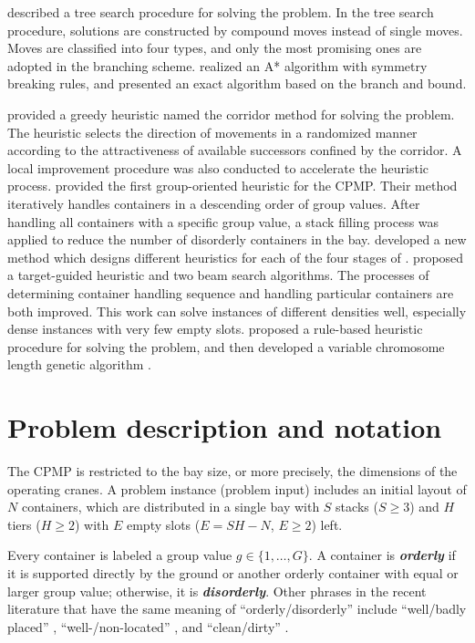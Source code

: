 \documentclass[review,3p,times,12pt,number]{elsarticle}\usepackage{amsmath}\usepackage{amssymb}
\renewcommand{\citet}[1]{\citeauthor{#1} \citep{#1}}
\renewcommand{\emph}[1]{\textbf{\textit{#1}}}
\begin{document}
\citet{bort2012} described a tree search procedure for solving the problem.
In the tree search procedure, solutions are constructed by compound moves instead of single moves. Moves are classified into four types, and only the most promising ones are adopted in the branching scheme. \citet{tierney2014} realized an A* algorithm with symmetry breaking rules, and \citet{van2014} presented an exact algorithm based on the branch and bound.


\citet{cas2009} provided a greedy heuristic named the corridor method for solving the problem. The heuristic selects the direction of movements in a randomized manner according to the attractiveness of available successors confined by the corridor.
A local improvement procedure was also conducted to accelerate the heuristic process.
\citet{exp2012} provided the first group-oriented heuristic for the CPMP\@. Their method iteratively handles containers in a descending order of group values. After handling all containers with a specific group value, a stack filling process was applied to reduce the number of disorderly containers in the bay.
\citet{jovanovic2014} developed a new method which designs different heuristics for each of the four stages of \citet{exp2012}.
\citet{wang2015} proposed a target-guided heuristic and two beam search algorithms.
The processes of determining container handling sequence and handling particular containers are both improved.
This work can solve instances of different densities well, especially dense instances with very few empty slots.
\citet{Gheith2014} proposed a rule-based heuristic procedure for solving the problem, and then developed a variable chromosome length genetic algorithm \citep{Gheith2015}.


\section{Problem description and notation}
\label{sec:problem}

The CPMP is restricted to the bay size, or more precisely, the dimensions of the operating cranes. A problem instance (problem input) includes an initial layout of $N$ containers, which are distributed in a single bay with $S$ stacks ($S\ge 3$) and $H$ tiers ($H\ge 2$) with $E$ empty slots ($E=SH-N$, $E\ge 2$) left.

Every container is labeled a group value $g \in\{1,\dots,G\}$. A container is \emph{orderly} if it is supported directly by the ground or another orderly container with equal or larger group value; otherwise, it is \emph{disorderly}. Other phrases in the recent literature that have the same meaning of ``orderly{\slash}disorderly''  include ``well{\slash}badly placed'' \citep{bort2012}, ``well-{\slash}non-located'' \citep{exp2012}, and ``clean{\slash}dirty'' \citep{wang2015}.
\end{document}
